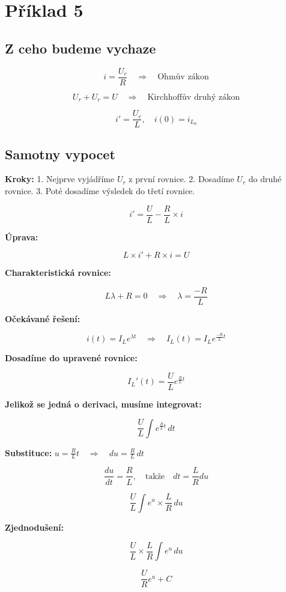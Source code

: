 \section{Příklad 5}
\sloppy

\subsection*{Z ceho budeme vychaze}
\[
i = \frac{U_r}{R} \quad \Rightarrow \quad \text{Ohmův zákon}
\]

\[
U_r + U_r = U \quad \Rightarrow \quad \text{Kirchhoffův druhý zákon}
\]

\[
i' = \frac{U_c}{L}, \quad i(0) = i_{L_0}
\]
\subsection*{Samotny vypocet}
\textbf{Kroky:}
1. Nejprve vyjádříme \( U_r \) z první rovnice.
2. Dosadíme \( U_r \) do druhé rovnice.
3. Poté dosadíme výsledek do třetí rovnice.

\[
i' = \frac{U}{L} - \frac{R}{L} \times i
\]

\textbf{Úprava:}

\[
L \times i' + R \times i = U
\]

\textbf{Charakteristická rovnice:}

\[
L\lambda + R = 0 \quad \Rightarrow \quad \lambda = \frac{-R}{L}
\]

\textbf{Očekávané řešení:}

\[
i(t) = I_L e^{\lambda t} \quad \Rightarrow \quad I_L(t) = I_L e^{\frac{-R}{L} t}
\]

\textbf{Dosadíme do upravené rovnice:}

\[
I_L'(t) = \frac{U}{L} e^{\frac{R}{L} t}
\]

\textbf{Jelikož se jedná o derivaci, musíme integrovat:}

\[
\frac{U}{L} \int e^{\frac{R}{L} t} \, dt
\]


\textbf{Substituce:} \( u = \frac{R}{L} t \quad \Rightarrow \quad du = \frac{R}{L} \, dt \)

\[
\frac{du}{dt} = \frac{R}{L}, \quad \text{takže} \quad dt = \frac{L}{R} du
\]

\[
\frac{U}{L} \int e^u \times \frac{L}{R} \, du
\]

\textbf{Zjednodušení:}

\[
\frac{U}{L} \times \frac{L}{R} \int e^u \, du
\]

\[
\frac{U}{R} e^u + C
\]


